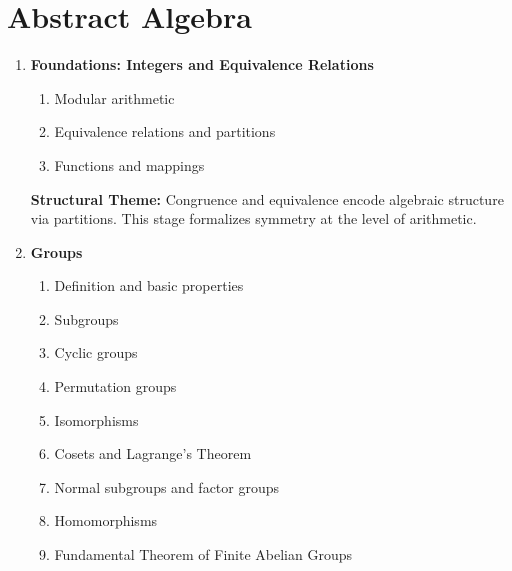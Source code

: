 

\section{Abstract Algebra}



\begin{enumerate}

\item \textbf{Foundations: Integers and Equivalence Relations}

\begin{enumerate}
    \item Modular arithmetic
    \item Equivalence relations and partitions
    \item Functions and mappings
\end{enumerate}

\vspace{0.5em}
\textbf{Structural Theme:}
Congruence and equivalence encode algebraic structure via partitions.
This stage formalizes symmetry at the level of arithmetic.


\item \textbf{Groups}

\begin{enumerate}
    \item Definition and basic properties
    \item Subgroups
    \item Cyclic groups
    \item Permutation groups
    \item Isomorphisms
    \item Cosets and Lagrange's Theorem
    \item Normal subgroups and factor groups
    \item Homomorphisms
    \item Fundamental Theorem of Finite Abelian Groups
\end{enumerate}


\end{enumerate}
